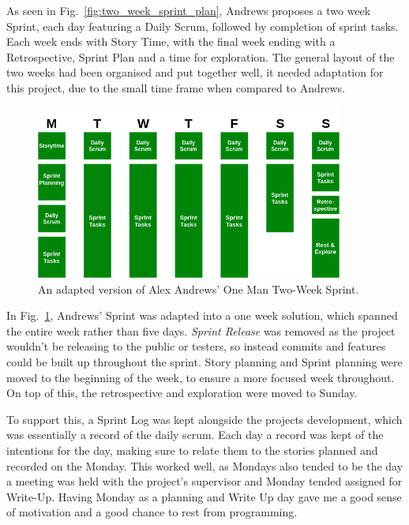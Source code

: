 \documentclass[a4paper,10pt]{report}
\begin{document}
As seen in Fig.~\ref{fig:two_week_sprint_plan}, Andrews proposes a two week Sprint, each day featuring a Daily Scrum, followed by completion of sprint tasks. Each week ends with Story Time, with the final week ending with a Retrospective, Sprint Plan and a time for exploration. The general layout of the two weeks had been organised and put together well, it needed adaptation for this project, due to the small time frame when compared to Andrews. \medskip

\begin{figure}[h!]
    \centering
  \includegraphics[width=0.9\textwidth]{Images/Charts/Sprint_Plan.png}
 \caption{An adapted version of Alex Andrews' One Man Two-Week Sprint.}
 \label{fig:one_week_sprint_plan}
\end{figure}

In Fig.~\ref{fig:one_week_sprint_plan}, Andrews' Sprint was adapted into a one week solution, which spanned the entire week rather than five days. \textit{Sprint Release} was removed as the project wouldn't be releasing to the public or testers, so instead commits and features could be built up throughout the sprint. Story planning and Sprint planning were moved to the beginning of the week, to ensure a more focused week throughout. On top of this, the retrospective and exploration were moved to Sunday. \medskip

To support this, a Sprint Log was kept alongside the projects development, which was essentially a record of the daily scrum. Each day a record was kept of the intentions for the day, making sure to relate them to the stories planned and recorded on the Monday. This worked well, as Mondays also tended to be the day a meeting was held with the project's supervisor and Monday tended assigned for Write-Up. Having Monday as a planning and Write Up day gave me a good sense of motivation and a good chance to rest from programming. \medskip
\end{document}
